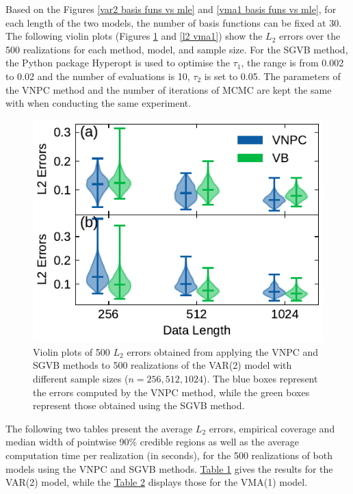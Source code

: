 \documentclass[%
 reprint,
 amsmath,amssymb,
 aps,
]{revtex4-2}
\begin{document}
Based on the Figures \ref{var2 basis funs vs mle} and \ref{vma1 basis funs vs mle}, for each length of the two models, the number of basis functions can be fixed at 30. The following violin plots (Figures \ref{l2 var2} and \ref{l2 vma1}) show the  $L_2$ errors over the 500 realizations for each method, model, and sample size. For the SGVB method, the Python package Hyperopt is used to optimise the $\tau_1$, the range is from 0.002 to 0.02 and the number of evaluations is 10, $\tau_2$ is set to 0.05.
The parameters of the VNPC method and the number of iterations of MCMC are kept the same with \cite{LiuYixuan2024Ancl}  when conducting the same experiment. 
\begin{figure}
\begin{minipage}{0.5\textwidth}
  \includegraphics[width=\textwidth]{sim_error_violins.pdf}
  \caption{
  Violin plots of 500  $L_2$ errors obtained from applying the VNPC and SGVB methods to 500 realizations of the VAR(2) model with different sample sizes ($n = 256, 512, 1024$). The blue boxes represent the errors computed by the VNPC method, while the green boxes represent those obtained using the SGVB method.}
  \label{l2 var2}
\end{minipage}
\end{figure}


The following two tables present the average  $L_2$ errors, empirical coverage and median width of pointwise 90\% credible regions as well as the average computation time per realization (in seconds), for the 500 realizations of both models using the VNPC and SGVB methods. \hyperref[table l1l2 var2]{Table 1} gives the results for  the VAR(2) model, while the \hyperref[table l1l2 vma1]{Table 2} displays those for  the VMA(1) model.
\end{document}
